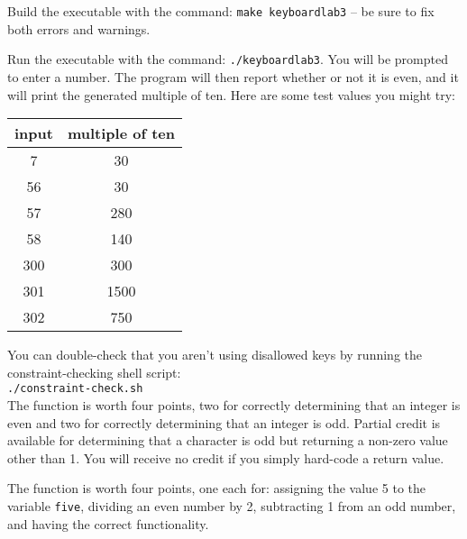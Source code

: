 Build the executable with the command: \texttt{make keyboardlab3} -- be sure to fix both errors and warnings.

Run the executable with the command: \texttt{./keyboardlab3}.
You will be prompted to enter a number.
The program will then report whether or not it is even, and it will print the generated multiple of ten.
Here are some test values you might try:

\begin{center}
    \begin{tabular}{cc}
        input   & multiple of ten \\ \hline
        7       & 30    \\
        56      & 30    \\
        57      & 280   \\
        58      & 140   \\
        300     & 300   \\
        301     & 1500  \\
        302     & 750   \\
    \end{tabular}
\end{center}

You can double-check that you aren't using disallowed keys by running the constraint-checking shell script: \\
\texttt{./constraint-check.sh} \\

The  function is worth four points, two for correctly determining that an integer is even and  two for correctly determining that an integer is odd.
Partial credit is available for determining that a character is odd but returning a non-zero value other than 1.
You will receive no credit if you simply hard-code a return value.

The  function is worth four points, one each for: assigning the value 5 to the variable \lstinline{five}, dividing an even number by 2, subtracting 1 from an odd number, and having the correct functionality.
